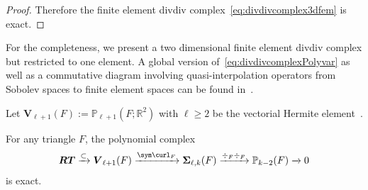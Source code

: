 \begin{proof}
\medskip

Therefore the finite element divdiv complex~\eqref{eq:divdivcomplex3dfem} is exact.
\end{proof}




For the completeness, we present a two dimensional finite element divdiv complex but restricted to one element. A global version of~\eqref{eq:divdivcomplexPolyvar} as well as a commutative diagram involving quasi-interpolation operators from Sobolev spaces to finite element spaces can be found in~\cite{ChenHuang2020}.  

%
%
Let $\boldsymbol V_{\ell+1}(F):=\mathbb P_{\ell+1}(F;\mathbb R^2)$ with $\ell\geq2$ be the vectorial Hermite element~\cite{BrennerScott2008,Ciarlet1978}. 

\begin{lemma}
For any triangle $F$, the polynomial complex
\begin{equation}\label{eq:divdivcomplexPolyvar}
\boldsymbol  {RT}\xrightarrow{\subset} \boldsymbol V_{\ell+1}(F)\xrightarrow{\sym\curl_F} \boldsymbol \Sigma_{\ell,k}(F) \xrightarrow{\div_F{\div_F}} \mathbb P_{k-2}(F)\xrightarrow{}0
\end{equation}
is exact.
\end{lemma}

